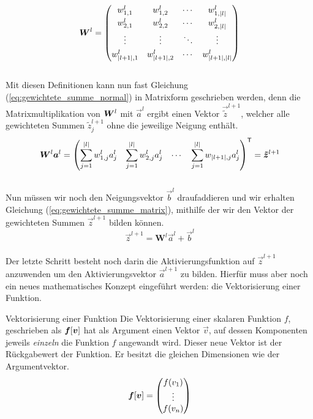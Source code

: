 \begin{equation*}
  \bm{W}^l =
  \begin{pmatrix}
    w_{1,1}^l & w_{1,2}^l & \cdots & w_{1,|l|}^l \\[0.3em]
    w_{2,1}^l & w_{2,2}^l & \cdots & w_{2,|l|}^l \\[0.3em]
    \vdots & \vdots & \ddots & \vdots \\[0.3em]
    w_{|l+1|,1}^l & w_{|l+1|,2}^l & \cdots & w_{|l+1|,|l|}^l
  \end{pmatrix}
\end{equation*}
\\
Mit diesen Definitionen kann nun fast Gleichung (\ref{eq:gewichtete_summe_normal}) in
Matrixform geschrieben werden, denn die Matrixmultiplikation von $\bm{W}^l$ mit
$\vec{a}^{l}$ ergibt einen Vektor $\vec{\tilde{z}}^{l+1}$, welcher alle gewichteten
Summen $\tilde{z}_j^{l+1}$ ohne die jeweilige Neigung enthält.
\\
\begin{equation*}
  \bm{W}^l \bm{a}^{l} = \begin{pmatrix}\displaystyle \sum_{j=1}^{|l|} w_{1,j}^l a_j^l &\displaystyle \sum_{j=1}^{|l|} w_{2,j}^l a_j^l & \cdots &\displaystyle \sum_{j=1}^{|l|} w_{|l+1|,j} a_j^l \end{pmatrix}^{\mathsf{T}} = \bm{\tilde{z}}^{l+1}
\end{equation*}
\\
Nun müssen wir noch den Neigungsvektor $\vec{b}^l$ draufaddieren und wir
erhalten Gleichung (\ref{eq:gewichtete_summe_matrix}), mithilfe der wir den
Vektor der gewichteten Summen $\vec{z}^{l+1}$ bilden können.
\\
\begin{equation}\tag{FP1a}\label{eq:gewichtete_summe_matrix}
  \vec{z}^{l+1} = \mathbf{W}^{l} \vec{a}^{l} + \vec{b}^{l}
\end{equation}
\\
Der letzte Schritt besteht noch darin die Aktivierungsfunktion auf $\vec{z}^{l+1}$
anzuwenden um den Aktivierungsvektor $\vec{a}^{l+1}$ zu bilden.
Hierfür muss aber noch ein neues mathematisches
Konzept eingeführt werden: die Vektorisierung einer Funktion.
\para{}

\begin{defbox}{Vektorisierung einer Funktion}
  Die Vektorisierung einer skalaren Funktion $f$, geschrieben als
  $\bm{f}[\bm{v}]$ hat als Argument einen Vektor $\vec{v}$, auf dessen
  Komponenten jeweils \textit{einzeln} die Funktion $f$ angewandt wird. Dieser neue
  Vektor ist der Rückgabewert der Funktion. Er besitzt die gleichen Dimensionen
  wie der Argumentvektor.
  \\
  \begin{equation*}
    \bm{f}[\bm{v}]=
    \begin{pmatrix}
      f(v_1)\\
      \vdots \\
      f(v_n)\\
    \end{pmatrix}
  \end{equation*}
\end{defbox}

